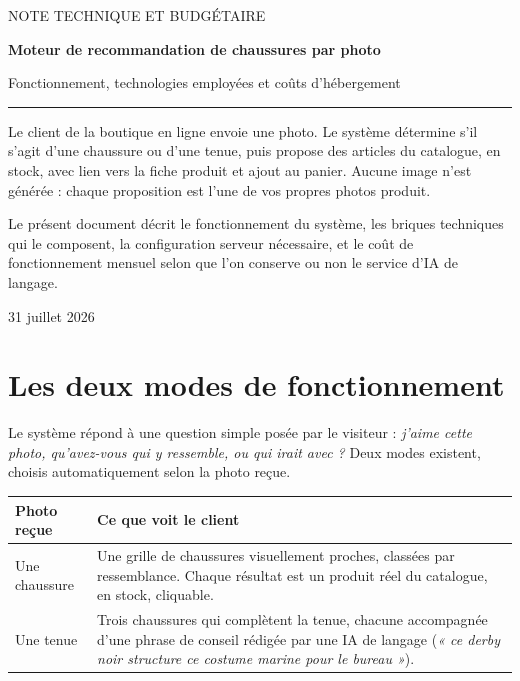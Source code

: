 \documentclass[11pt,a4paper]{article}
\begin{document}
\thispagestyle{empty}
\vspace*{2cm}

\noindent
{\footnotesize NOTE TECHNIQUE ET BUDGÉTAIRE}

\vspace{0.6cm}
\noindent
{\LARGE\bfseries Moteur de recommandation de chaussures par photo}

\vspace{0.5cm}
\noindent
{\large Fonctionnement, technologies employées et coûts d'hébergement}

\vspace{0.4cm}
\noindent\rule{\linewidth}{0.4pt}

\vspace{1.2cm}
\noindent
Le client de la boutique en ligne envoie une photo. Le système détermine s'il
s'agit d'une chaussure ou d'une tenue, puis propose des articles du catalogue,
en stock, avec lien vers la fiche produit et ajout au panier. Aucune image
n'est générée : chaque proposition est l'une de vos propres photos produit.

\vspace{0.8cm}
\noindent
Le présent document décrit le fonctionnement du système, les briques
techniques qui le composent, la configuration serveur nécessaire, et le coût
de fonctionnement mensuel selon que l'on conserve ou non le service d'IA de
langage.

\vspace{2cm}
\noindent
{\footnotesize 31 juillet 2026}

\newpage

{\small\tableofcontents}

\newpage

\section{Les deux modes de fonctionnement}

Le système répond à une question simple posée par le visiteur : \emph{j'aime
cette photo, qu'avez-vous qui y ressemble, ou qui irait avec ?} Deux modes
existent, choisis automatiquement selon la photo reçue.

\vspace{0.5em}
\begin{tabularx}{\textwidth}{L{3.2cm} X}
\toprule
\textbf{Photo reçue} & \textbf{Ce que voit le client} \\
\midrule
Une chaussure &
Une grille de chaussures visuellement proches, classées par ressemblance.
Chaque résultat est un produit réel du catalogue, en stock, cliquable. \\
Une tenue &
Trois chaussures qui complètent la tenue, chacune accompagnée d'une phrase de
conseil rédigée par une IA de langage (\emph{« ce derby noir structure ce
costume marine pour le bureau »}). \\
\bottomrule
\end{tabularx}
\end{document}
